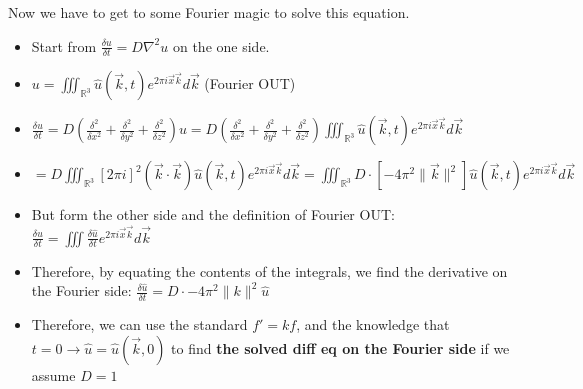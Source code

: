 \documentclass[11pt, oneside]{article}   	%
\begin{document}
Now we have to get to some Fourier magic to solve this equation.
\begin{itemize}
\item Start from  $\frac{\delta u}{\delta t} = D\nabla ^2 u$ on the one side.
\item $u = \iiint_{\mathbb{R}^3} \hat{u}(\vec{k}, t)e^{2\pi i \vec{x}\vec{k}}d\vec{k}$ (Fourier OUT)
\item $\frac{\delta u}{\delta t} = D( \frac{\delta ^2}{\delta x^2} +  \frac{\delta ^2}{\delta y^2}  + \frac{\delta ^2}{\delta z^2} )u =  D( \frac{\delta ^2}{\delta x^2} +  \frac{\delta ^2}{\delta y^2}  + \frac{\delta ^2}{\delta z^2} )\iiint_{\mathbb{R}^3} \hat{u}(\vec{k}, t)e^{2\pi i \vec{x}\vec{k}}d\vec{k}$
\item $=D\iiint_{\mathbb{R}^3} [2\pi i]^2(\vec{k}\cdot\vec{k}) \hat{u}(\vec{k}, t)e^{2\pi i \vec{x}\vec{k}}d\vec{k} =\iiint_{\mathbb{R}^3} D\cdot[-4\pi^2\|\vec{k}\|^2]\hat{u}(\vec{k}, t)e^{2\pi i \vec{x}\vec{k}}d\vec{k} $
\item But form the other side and the definition of Fourier OUT: $\frac{\delta u}{\delta t} = \iiint \frac{\delta \hat{u}}{\delta t} e^{2\pi i \vec{x}\vec{k}}d\vec{k} $
\item Therefore, by equating the contents of the integrals, we find the derivative on the Fourier side: $\frac{\delta \hat{u}}{\delta t} = D\cdot -4\pi^2\|k\|^2\hat{u}$
\item Therefore, we can use the standard $f' = kf$, and the knowledge that $t=0 \rightarrow \hat{u} = \hat{u}(\vec{k}, 0)$ to find \textbf{the solved diff eq on the Fourier side}  if we assume $D=1$
\end{itemize}
\end{document}

